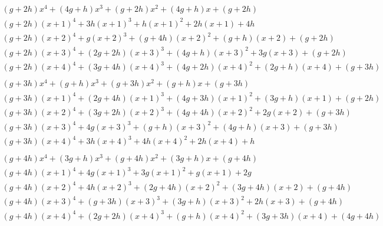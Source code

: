 \documentclass[a4paper, 10pt]{extarticle}
\begin{document}
$$\begin{array}{l}
(g + 2h)x^4 + (4g + h)x^3 + (g + 2h)x^2 + (4g + h)x + (g + 2h) \\
(g + 2h)(x+1)^4 + 3h(x+1)^3 + h(x+1)^2 + 2h(x+1) + 4h \\
(g + 2h)(x+2)^4 + g(x+2)^3 + (g + 4h)(x+2)^2 + (g + h)(x+2) + (g + 2h) \\
(g + 2h)(x+3)^4 + (2g + 2h)(x+3)^3 + (4g + h)(x+3)^2 + 3g(x+3) + (g + 2h) \\
(g + 2h)(x+4)^4 + (3g + 4h)(x+4)^3 + (4g + 2h)(x+4)^2 + (2g + h)(x+4) + (g + 3h) \\
\end{array}$$
$$\begin{array}{l}
(g + 3h)x^4 + (g + h)x^3 + (g + 3h)x^2 + (g + h)x + (g + 3h) \\
(g + 3h)(x+1)^4 + (2g + 4h)(x+1)^3 + (4g + 3h)(x+1)^2 + (3g + h)(x+1) + (g + 2h) \\
(g + 3h)(x+2)^4 + (3g + 2h)(x+2)^3 + (4g + 4h)(x+2)^2 + 2g(x+2) + (g + 3h) \\
(g + 3h)(x+3)^4 + 4g(x+3)^3 + (g + h)(x+3)^2 + (4g + h)(x+3) + (g + 3h) \\
(g + 3h)(x+4)^4 + 3h(x+4)^3 + 4h(x+4)^2 + 2h(x+4) + h \\
\end{array}$$
$$\begin{array}{l}
(g + 4h)x^4 + (3g + h)x^3 + (g + 4h)x^2 + (3g + h)x + (g + 4h) \\
(g + 4h)(x+1)^4 + 4g(x+1)^3 + 3g(x+1)^2 + g(x+1) + 2g \\
(g + 4h)(x+2)^4 + 4h(x+2)^3 + (2g + 4h)(x+2)^2 + (3g + 4h)(x+2) + (g + 4h) \\
(g + 4h)(x+3)^4 + (g + 3h)(x+3)^3 + (3g + h)(x+3)^2 + 2h(x+3) + (g + 4h) \\
(g + 4h)(x+4)^4 + (2g + 2h)(x+4)^3 + (g + h)(x+4)^2 + (3g + 3h)(x+4) + (4g + 4h) \\
\end{array}$$
\end{document}
